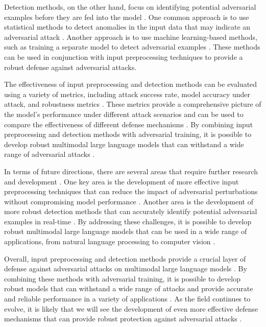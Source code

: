 \documentclass[11pt,a4paper]{article}
\begin{document}
Detection methods, on the other hand, focus on identifying potential adversarial examples before they are fed into the model \cite{arxiv:2407.21534}. One common approach is to use statistical methods to detect anomalies in the input data that may indicate an adversarial attack \cite{arxiv:2409.05840}. Another approach is to use machine learning-based methods, such as training a separate model to detect adversarial examples \cite{arxiv:2405.10140}. These methods can be used in conjunction with input preprocessing techniques to provide a robust defense against adversarial attacks.

The effectiveness of input preprocessing and detection methods can be evaluated using a variety of metrics, including attack success rate, model accuracy under attack, and robustness metrics \cite{arxiv:2408.08632}. These metrics provide a comprehensive picture of the model's performance under different attack scenarios and can be used to compare the effectiveness of different defense mechanisms \cite{arxiv:2409.18991}. By combining input preprocessing and detection methods with adversarial training, it is possible to develop robust multimodal large language models that can withstand a wide range of adversarial attacks \cite{arxiv:2405.19335}.

In terms of future directions, there are several areas that require further research and development \cite{arxiv:2601.10710}. One key area is the development of more effective input preprocessing techniques that can reduce the impact of adversarial perturbations without compromising model performance \cite{arxiv:2601.11464}. Another area is the development of more robust detection methods that can accurately identify potential adversarial examples in real-time \cite{arxiv:2509.07979}. By addressing these challenges, it is possible to develop robust multimodal large language models that can be used in a wide range of applications, from natural language processing to computer vision \cite{arxiv:2502.16586}.

Overall, input preprocessing and detection methods provide a crucial layer of defense against adversarial attacks on multimodal large language models \cite{arxiv:2512.06281}. By combining these methods with adversarial training, it is possible to develop robust models that can withstand a wide range of attacks and provide accurate and reliable performance in a variety of applications \cite{arxiv:2506.11976}. As the field continues to evolve, it is likely that we will see the development of even more effective defense mechanisms that can provide robust protection against adversarial attacks \cite{arxiv:2503.02597}.
\end{document}
